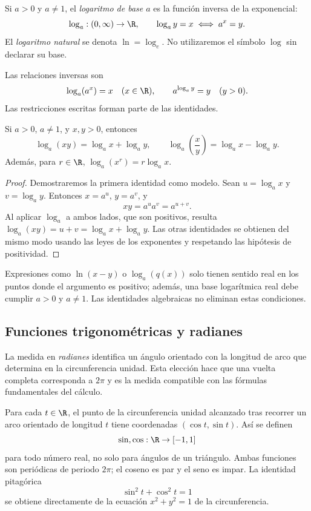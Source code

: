 Si \(a>0\) y \(a\ne1\), el \emph{logaritmo de base \(a\)} es la función
inversa de la exponencial:
\[
  \log_a:(0,\infty)\to\R,
  \qquad
  \log_a y=x \iff a^x=y.
\]
El \emph{logaritmo natural} se denota \(\ln=\log_e\). No utilizaremos el
símbolo \(\log\) sin declarar su base.

Las relaciones inversas son
\[
  \log_a(a^x)=x \quad(x\in\R),
  \qquad
  a^{\log_a y}=y \quad(y>0).
\]
Las restricciones escritas forman parte de las identidades.

\begin{proposicion}
Si \(a>0\), \(a\ne1\), y \(x,y>0\), entonces
\[
 \log_a(xy)=\log_a x+\log_a y,
 \qquad
 \log_a\!\left(\frac{x}{y}\right)=\log_a x-\log_a y.
\]
Además, para \(r\in\R\), \(\log_a(x^r)=r\log_a x\).
\end{proposicion}

\begin{proof}
Demostraremos la primera identidad como modelo. Sean
\(u=\log_a x\) y \(v=\log_a y\). Entonces \(x=a^u\), \(y=a^v\), y
\[
  xy=a^u a^v=a^{u+v}.
\]
Al aplicar \(\log_a\) a ambos lados, que son positivos, resulta
\(\log_a(xy)=u+v=\log_a x+\log_a y\). Las otras identidades se obtienen del
mismo modo usando las leyes de los exponentes y respetando las hipótesis de
positividad.
\end{proof}

\begin{advertencia}
Expresiones como \(\ln(x-y)\) o \(\log_a(q(x))\) solo tienen sentido real en
los puntos donde el argumento es positivo; además, una base logarítmica real
debe cumplir \(a>0\) y \(a\ne1\). Las identidades algebraicas no eliminan
estas condiciones.
\end{advertencia}

\subsection{Funciones trigonométricas y radianes}

La medida en \emph{radianes} identifica un ángulo orientado con la longitud de
arco que determina en la circunferencia unidad. Esta elección hace que una
vuelta completa corresponda a \(2\pi\) y es la medida compatible con las
fórmulas fundamentales del cálculo.

Para cada \(t\in\R\), el punto de la circunferencia unidad alcanzado tras
recorrer un arco orientado de longitud \(t\) tiene coordenadas
\((\cos t,\sin t)\). Así se definen
\[
  \sin,\cos:\R\to[-1,1]
\]
para todo número real, no solo para ángulos de un triángulo. Ambas funciones
son periódicas de periodo \(2\pi\); el coseno es par y el seno es impar. La
identidad pitagórica
\[
  \sin^2 t+\cos^2 t=1
\]
se obtiene directamente de la ecuación \(x^2+y^2=1\) de la circunferencia.

